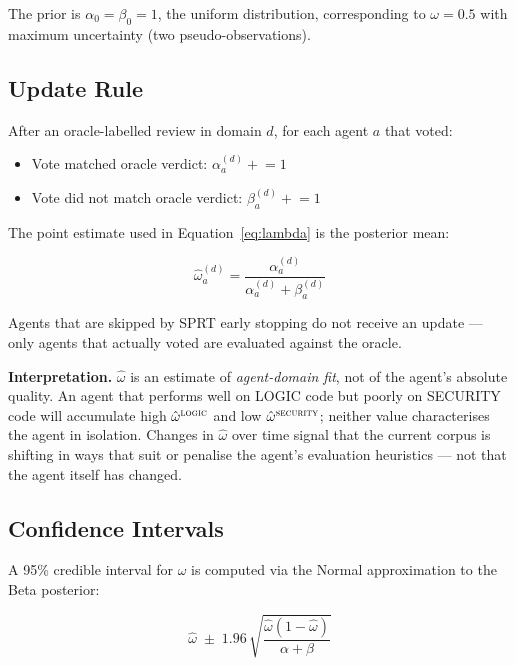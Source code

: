 \documentclass[11pt,a4paper]{article}
\begin{document}
The prior is $\alpha_0 = \beta_0 = 1$, the uniform distribution, corresponding
to $\omega = 0.5$ with maximum uncertainty (two pseudo-observations).

\subsection{Update Rule}

After an oracle-labelled review in domain $d$, for each agent $a$ that voted:
\begin{itemize}
  \item Vote matched oracle verdict: $\alpha_a^{(d)} \mathrel{+}= 1$
  \item Vote did not match oracle verdict: $\beta_a^{(d)} \mathrel{+}= 1$
\end{itemize}

The point estimate used in Equation~\ref{eq:lambda} is the posterior mean:

\begin{equation}
  \hat{\omega}_a^{(d)} = \frac{\alpha_a^{(d)}}{\alpha_a^{(d)} + \beta_a^{(d)}}
\end{equation}

Agents that are skipped by SPRT early stopping do not receive an update —
only agents that actually voted are evaluated against the oracle.

\medskip\noindent\textbf{Interpretation.} $\hat\omega$ is an estimate of
\emph{agent-domain fit}, not of the agent's absolute quality. An agent that
performs well on LOGIC code but poorly on SECURITY code will accumulate high
$\hat\omega^{\textsc{logic}}$ and low $\hat\omega^{\textsc{security}}$; neither
value characterises the agent in isolation. Changes in $\hat\omega$ over time
signal that the current corpus is shifting in ways that suit or penalise the
agent's evaluation heuristics — not that the agent itself has changed.

\subsection{Confidence Intervals}

A 95\% credible interval for $\omega$ is computed via the Normal
approximation to the Beta posterior:

\begin{equation}
  \hat{\omega} \;\pm\; 1.96\,\sqrt{\frac{\hat{\omega}(1-\hat{\omega})}
                                         {\alpha + \beta}}
\end{equation}
\end{document}
